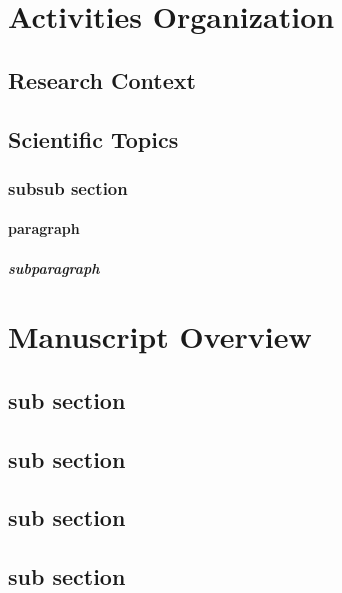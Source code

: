 \section{Activities Organization}\label{sec:activities}

\subsection{Research Context}\label{sec:research:context}
\subsection{Scientific Topics}\label{sec:research}

\subsubsection{subsub section}\label{sec:subsubsection}
\paragraph{paragraph}\label{sec:paragraph}
\subparagraph{subparagraph}\label{sec:subparagraph}

\section{Manuscript Overview}\label{sec:org}



\subsection{sub section}\label{sec:subsectionA}
\subsection{sub section}\label{sec:subsectionB}
\subsection{sub section}\label{sec:subsectionC}
\subsection{sub section}\label{sec:subsectionD}




